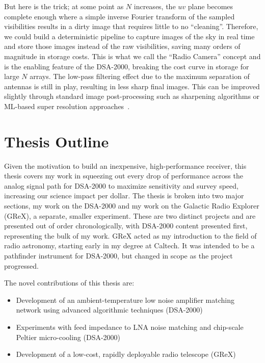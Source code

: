 But here is the trick; at some point as $N$ increases, the $uv$ plane becomes complete enough where a simple inverse Fourier transform of the sampled visibilities results in a dirty image that requires little to no ``cleaning''.
Therefore, we could build a deterministic pipeline to capture images of the sky in real time and store those images instead of the raw visibilities, saving many orders of magnitude in storage costs.
This is what we call the ``Radio Camera'' concept and is the enabling feature of the DSA-2000, breaking the cost curve in storage for large $N$ arrays.
The low-pass filtering effect due to the maximum separation of antennas is still in play, resulting in less sharp final images.
This can be improved slightly through standard image post-processing such as sharpening algorithms or ML-based super resolution approaches~\cite{connorDeepRadiointerferometricImaging2022}.

\section{Thesis Outline}

Given the motivation to build an inexpensive, high-performance receiver, this thesis covers my work in squeezing out every drop of performance across the analog signal path for DSA-2000 to maximize sensitivity and survey speed, increasing our science impact per dollar.
The thesis is broken into two major sections, my work on the DSA-2000 and my work on the Galactic Radio Explorer (GReX), a separate, smaller experiment.
These are two distinct projects and are presented out of order chronologically, with DSA-2000 content presented first, representing the bulk of my work.
GReX acted as my introduction to the field of radio astronomy, starting early in my degree at Caltech.
It was intended to be a pathfinder instrument for DSA-2000, but changed in scope as the project progressed.

The novel contributions of this thesis are:
\begin{itemize}
    \item Development of an ambient-temperature low noise amplifier matching network using advanced algorithmic techniques (DSA-2000)
    \item Experiments with feed impedance to LNA noise matching and chip-scale Peltier micro-cooling (DSA-2000)
    \item Development of a low-cost, rapidly deployable radio telescope (GReX)
\end{itemize}

